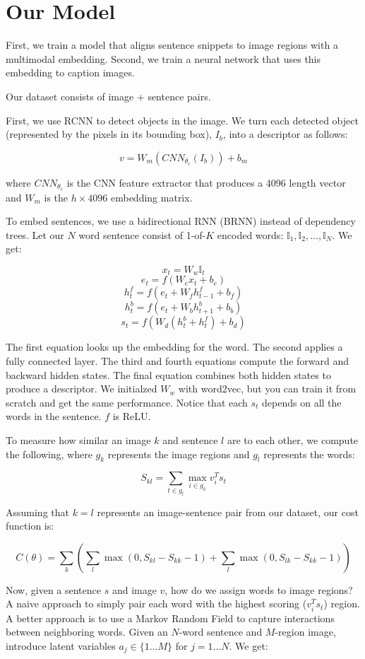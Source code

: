 \documentclass[a4paper]{article}
\begin{document}
\section{Our Model}
First, we train a model that aligns sentence snippets to image regions with
a multimodal embedding. Second, we train a neural network that uses this
embedding to caption images.

Our dataset consists of image + sentence pairs.

First, we use RCNN to detect objects in the image. We turn each detected
object (represented by the pixels in its bounding box), $I_b$, into a 
descriptor as follows:

$$
v = W_m(CNN_{\theta_c}(I_b)) + b_m
$$

where $CNN_{\theta_c}$ is the CNN feature extractor that produces a 4096 length
vector and  $W_m$ is the $h \times 4096$ embedding matrix.

To embed sentences, we use a bidirectional RNN (BRNN) instead of dependency
trees. Let our $N$ word sentence consist of 1-of-$K$ encoded words:
$\mathbb{I}_1, \mathbb{I}_2, ..., \mathbb{I}_N$. We get:

$$
x_t = W_w \mathbb{I}_t
$$
$$
e_t = f(W_e x_t + b_e)
$$
$$
h_t^f = f(e_t + W_f h_{t-1}^f + b_f)
$$
$$
h_t^b = f(e_t + W_b h_{t+1}^b + b_b)
$$
$$
s_t = f(W_d(h_t^b + h_t^f) + b_d)
$$

The first equation looks up the embedding for the word. The second applies
a fully connected layer. The third and fourth equations compute the forward
and backward hidden states. The final equation combines both hidden states
to produce a descriptor. We initialzed $W_w$ with word2vec, but you can 
train it from scratch and get the same performance. Notice that each $s_t$
depends on all the words in the sentence. $f$ is ReLU.

To measure how similar an image $k$ and sentence $l$ are to each other,
we compute the following, where $g_k$ represents the image regions and
$g_l$ represents the words:

$$
S_{kl} = \sum_{t \in g_l}{\max_{i \in g_k}{v_i^T s_t}}
$$

Assuming that $k = l$ represents an image-sentence pair from our dataset,
our cost function is:

$$
C(\theta) = \sum_{k}{
  \left(
    \sum_{l}{\max(0, S_{kl} - S_{kk} - 1)}
    + \sum_{l}{\max(0, S_{lk} - S_{kk} - 1)}
  \right)
 }
$$

Now, given a sentence $s$ and image $v$, how do we assign words to image
regions? A naive approach to simply pair each word with the highest
scoring ($v_i^T s_t$) region. A better approach is to use a Markov Random Field
to capture interactions between neighboring words. Given an $N$-word sentence
and $M$-region image, introduce latent variables $a_j \in \{1...M\}$ for
$j = 1...N$. We get:
\end{document}
